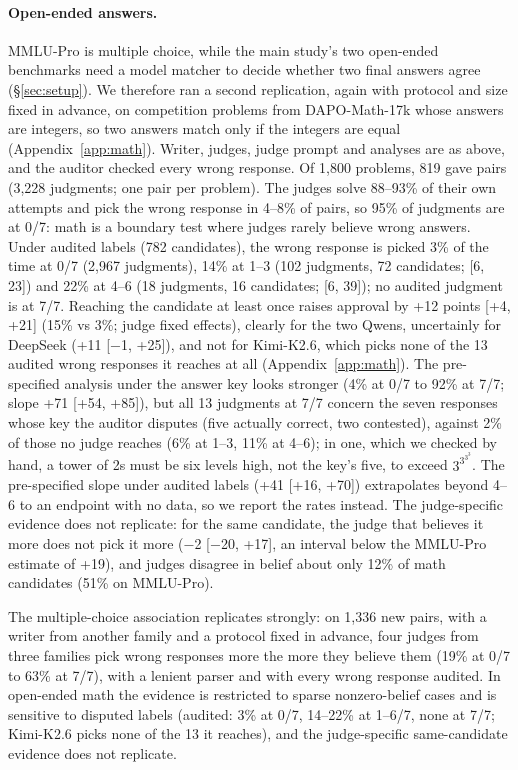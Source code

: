 \documentclass[11pt]{article}
\newcounter{takeaway}
\begin{document}
\paragraph{Open-ended answers.}
MMLU-Pro is multiple choice, while the main study's two open-ended benchmarks need a model matcher to decide whether
two final answers agree (\S\ref{sec:setup}). We therefore ran a second replication, again with protocol and size fixed
in advance, on competition problems from DAPO-Math-17k \citep{yu2025dapo} whose answers are integers, so two answers
match only if the integers are equal (Appendix~\ref{app:math}). Writer, judges, judge prompt and analyses are as above, and
the auditor checked every wrong response. Of 1,800 problems, 819 gave pairs (3,228 judgments; one pair per problem).
The judges solve 88--93\% of their own attempts and pick the wrong response in 4--8\% of pairs, so 95\% of judgments
are at 0/7: math is a boundary test where judges rarely believe wrong answers. Under audited labels (782
candidates), the wrong response is picked 3\% of the time at 0/7 (2,967 judgments), 14\% at 1--3 (102 judgments, 72
candidates; [6, 23]) and 22\% at 4--6 (18 judgments, 16 candidates; [6, 39]); no audited judgment is at 7/7. Reaching
the candidate at least once raises approval by +12 points [+4, +21] (15\% vs 3\%; judge fixed effects), clearly for
the two Qwens, uncertainly for DeepSeek (+11 [$-$1, +25]), and not for Kimi-K2.6, which picks none of the 13 audited
wrong responses it reaches at all (Appendix~\ref{app:math}). The pre-specified analysis under the answer key looks
stronger (4\% at 0/7 to 92\% at 7/7; slope +71 [+54, +85]), but all 13 judgments at 7/7 concern the seven responses
whose key the auditor disputes (five actually correct, two contested), against 2\% of those no judge reaches (6\% at
1--3, 11\% at 4--6); in one, which we checked by hand, a tower of 2s must be six levels high, not the key's five, to
exceed $3^{3^{3^3}}$. The pre-specified slope under audited labels (+41 [+16, +70]) extrapolates beyond 4--6 to an
endpoint with no data, so we report the rates instead. The judge-specific evidence does not replicate: for the same candidate, the judge that believes it more
does not pick it more ($-$2 [$-$20, +17], an interval below the MMLU-Pro estimate of +19), and judges disagree in
belief about only 12\% of math candidates (51\% on MMLU-Pro).

\begin{takeaway}
The multiple-choice association replicates strongly: on 1,336 new pairs, with a writer from another family and a
protocol fixed in advance, four judges from three families pick wrong responses more the more they believe them
(19\% at 0/7 to 63\% at 7/7), with a lenient parser and with every wrong response audited. In open-ended math the
evidence is restricted to sparse nonzero-belief cases and is sensitive to disputed labels (audited: 3\% at 0/7, 14--22\%
at 1--6/7, none at 7/7; Kimi-K2.6 picks none of the 13 it reaches), and the judge-specific same-candidate evidence
does not replicate.
\end{takeaway}
\end{document}
